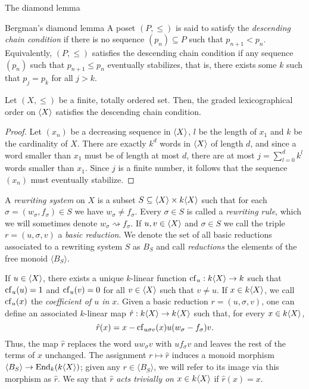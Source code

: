 \begin{chapter}{The diamond lemma}
\begin{section}{Bergman's diamond lemma}
A poset $(P,\leq)$ is said to satisfy the \emph{descending chain condition} if there is no sequence $(p_n)\subseteq P$ such that $p_{n+1}< p_n$. Equivalently, $(P,\leq)$ satisfies the descending chain condition if any sequence $(p_n)$ such that $p_{n+1} \leq p_n$ eventually stabilizes, that is, there exists some $k$ such that $p_j = p_k$ for all $j>k$.

\begin{lemma}\label{noeth} Let $(X,\leq)$ be a finite, totally ordered set. Then, the graded lexicographical order on $\langle X\rangle$ satisfies the descending chain condition.
\end{lemma}
\begin{proof} Let $(x_n)$ be a decreasing sequence in $\langle X\rangle$, $l$ be the length of $x_1$ and $k$ be the cardinality of $X$. There are exactly $k^d$ words in $\langle X\rangle$ of length $d$, and since a word smaller than $x_1$ must be of length at most $d$, there are at most $j=\sum_{l=0}^d k^l$ words smaller than $x_1$. Since $j$ is a finite number, it follows that the sequence $(x_n)$ must eventually stabilize.
\end{proof}

A \emph{rewriting system} on $X$ is a subset $S\subseteq \langle X\rangle \times k\langle X\rangle$ such that for each $\sigma=(w_\sigma, f_\sigma)\in S$ we have $w_\sigma \neq f_\sigma$. Every $\sigma \in S$ is called a \emph{rewriting rule}, which we will sometimes denote $w_\sigma \rightsquigarrow f_\sigma$. If $u,v\in\langle X\rangle$ and $\sigma\in S$ we call the triple $r=(u,\sigma,v)$ a \emph{basic reduction}. We denote the set of all basic reductions associated to a rewriting system $S$ as $B_S$ and call \emph{reductions} the elements of the free monoid $\langle B_S\rangle$.

If $u\in\langle X\rangle$, there exists a unique $k$-linear function $\mathrm{cf}_u:k\langle X\rangle\to k$ such that $\mathrm{cf}_u(u)=1$ and $\mathrm{cf}_u(v)=0$ for all $v\in\langle X\rangle$ such that $v\neq u$. If $x\in k\langle X\rangle$, we call $\mathrm{cf}_u(x)$ the \emph{coefficient of $u$ in $x$}. Given a basic reduction $r=(u,\sigma,v)$, one can define an associated $k$-linear map $\hat{r}:k\langle X\rangle\to k\langle X\rangle$ such that, for every $x\in k\langle X\rangle$,
\[\hat{r}(x)=x-\mathrm{cf}_{u\sigma v}(x) u(w_\sigma - f_\sigma)v.\]
Thus, the map $\hat{r}$ replaces the word $uw_\sigma v$ with $uf_\sigma v$ and leaves the rest of the terms of $x$ unchanged. The assignment $r\mapsto \hat{r}$ induces a monoid morphism $\langle B_S\rangle \to \operatorname{End}_k(k\langle X\rangle)$; given any $r\in\langle B_S\rangle$, we will refer to its image via this morphism as $\hat{r}$. We say that $\hat{r}$ \emph{acts trivially on $x\in k\langle X\rangle$} if $\hat{r}(x)=x$.


\end{section}
\end{chapter}
